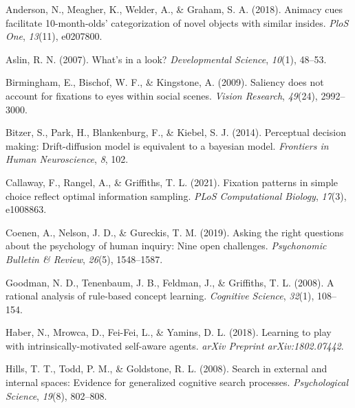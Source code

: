 \documentclass[10pt, letterpaper]{article}
\newenvironment{CSLReferences}%
  {}%
  {\par}
\begin{document}
\hypertarget{refs}{}
\begin{CSLReferences}{1}{0}
\leavevmode{}%
Anderson, N., Meagher, K., Welder, A., \& Graham, S. A. (2018). Animacy
cues facilitate 10-month-olds' categorization of novel objects with
similar insides. \emph{PloS One}, \emph{13}(11), e0207800.

\leavevmode{}%
Aslin, R. N. (2007). What's in a look? \emph{Developmental Science},
\emph{10}(1), 48--53.

\leavevmode{}%
Birmingham, E., Bischof, W. F., \& Kingstone, A. (2009). Saliency does
not account for fixations to eyes within social scenes. \emph{Vision
Research}, \emph{49}(24), 2992--3000.

\leavevmode{}%
Bitzer, S., Park, H., Blankenburg, F., \& Kiebel, S. J. (2014).
Perceptual decision making: Drift-diffusion model is equivalent to a
bayesian model. \emph{Frontiers in Human Neuroscience}, \emph{8}, 102.

\leavevmode{}%
Callaway, F., Rangel, A., \& Griffiths, T. L. (2021). Fixation patterns
in simple choice reflect optimal information sampling. \emph{PLoS
Computational Biology}, \emph{17}(3), e1008863.

\leavevmode{}%
Coenen, A., Nelson, J. D., \& Gureckis, T. M. (2019). Asking the right
questions about the psychology of human inquiry: Nine open challenges.
\emph{Psychonomic Bulletin \& Review}, \emph{26}(5), 1548--1587.

\leavevmode{}%
Goodman, N. D., Tenenbaum, J. B., Feldman, J., \& Griffiths, T. L.
(2008). A rational analysis of rule-based concept learning.
\emph{Cognitive Science}, \emph{32}(1), 108--154.

\leavevmode{}%
Haber, N., Mrowca, D., Fei-Fei, L., \& Yamins, D. L. (2018). Learning to
play with intrinsically-motivated self-aware agents. \emph{arXiv
Preprint arXiv:1802.07442}.

\leavevmode{}%
Hills, T. T., Todd, P. M., \& Goldstone, R. L. (2008). Search in
external and internal spaces: Evidence for generalized cognitive search
processes. \emph{Psychological Science}, \emph{19}(8), 802--808.


\end{CSLReferences}
\end{document}
